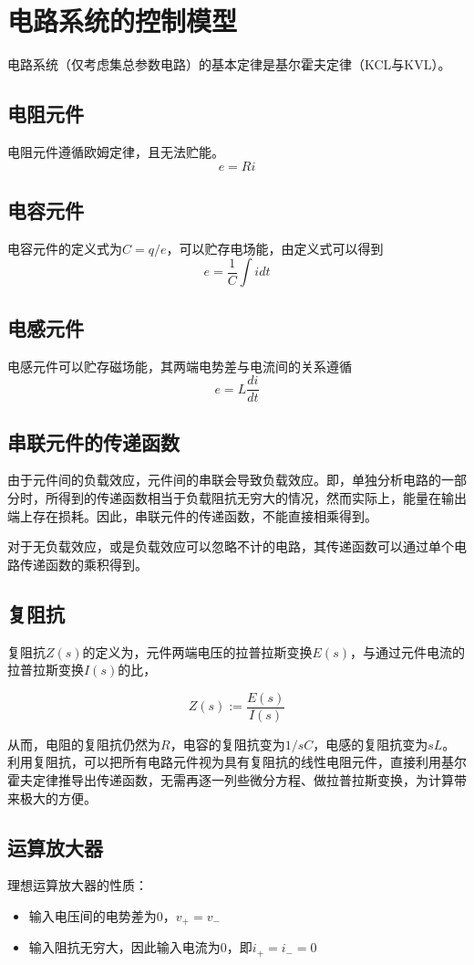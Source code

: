 \section{电路系统的控制模型}
电路系统（仅考虑集总参数电路）的基本定律是基尔霍夫定律（KCL与KVL）。
\subsection{电阻元件}
电阻元件遵循欧姆定律，且无法贮能。
\begin{equation*}
e=Ri
\end{equation*}

\subsection{电容元件}
电容元件的定义式为$C=q/{e}$，可以贮存电场能，由定义式可以得到
\begin{equation*}
e=\frac{1}{C}\int idt
\end{equation*}

\subsection{电感元件}
电感元件可以贮存磁场能，其两端电势差与电流间的关系遵循
\begin{equation*}
e=L\frac{di}{dt}
\end{equation*}

\subsection{串联元件的传递函数}

由于元件间的负载效应，元件间的串联会导致负载效应。即，单独分析电路的一部分时，所得到的传递函数相当于负载阻抗无穷大的情况，然而实际上，能量在输出端上存在损耗。因此，串联元件的传递函数，不能直接相乘得到。

对于无负载效应，或是负载效应可以忽略不计的电路，其传递函数可以通过单个电路传递函数的乘积得到。

\subsection{复阻抗}

复阻抗$Z(s)$的定义为，元件两端电压的拉普拉斯变换$E(s)$，与通过元件电流的拉普拉斯变换$I(s)$的比，

\begin{equation*}
Z(s):=\frac{E(s)}{I(s)}
\end{equation*}

从而，电阻的复阻抗仍然为$R$，电容的复阻抗变为$1/sC$，电感的复阻抗变为$sL$。利用复阻抗，可以把所有电路元件视为具有复阻抗的线性电阻元件，直接利用基尔霍夫定律推导出传递函数，无需再逐一列些微分方程、做拉普拉斯变换，为计算带来极大的方便。

\subsection{运算放大器}

理想运算放大器的性质：
\begin{itemize}
	\item	输入电压间的电势差为0，$v_+=v_-$
	\item	输入阻抗无穷大，因此输入电流为0，即$i_+=i_-=0$
\end{itemize}



